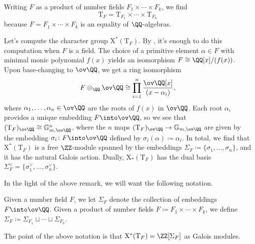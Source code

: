 \documentclass[../thesis.tex]{subfiles}
\begin{document}
\begin{remark} \label{rem:tf-of-algebra}
	Writing $F$ as a product of number fields $F_1\times\cdots\times F_k$, we find
	\[\mathrm T_F=\mathrm T_{F_1}\times\cdots\times\mathrm T_{F_k}\]
	because $F=F_1\times\cdots\times F_k$ is an equality of $\QQ$-algebras.
\end{remark}
\begin{remark}
	Let's compute the character group $\mathrm X^*(\mathrm T_F)$. By , it's enough to do this computation when $F$ is a field. The choice of a primitive element $\alpha\in F$ with minimal monic polynomial $f(x)$ yields an isomorphism $F\cong\QQ[x]/(f(x))$. Upon base-changing to $\ov\QQ$, we get a ring isomorphism
	\[F\otimes_\QQ\ov\QQ\cong\prod_{i=1}^n\frac{\ov\QQ[x]}{(x-\alpha_i)},\]
	where $\alpha_1,\ldots,\alpha_n\in\ov\QQ$ are the roots of $f(x)$ in $\ov\QQ$. Each root $\alpha_i$ provides a unique embedding $F\into\ov\QQ$, so we see that $(\mathrm T_F)_{\ov\QQ}\cong\mathbb G_{m,\ov\QQ}^n$, where the $n$ maps $(\mathrm T_F)_{\ov\QQ}\to\mathbb G_{m,\ov\QQ}$ are given by the embedding $\sigma_i\colon F\into\ov\QQ$ defined by $\sigma_i(\alpha)\coloneqq\alpha_i$. In total, we find that $\mathrm X^*(\mathrm T_F)$ is a free $\ZZ$-module spanned by the embeddings $\Sigma_F\coloneqq\{\sigma_1,\ldots,\sigma_n\}$, and it has the natural Galois action. Dually, $\mathrm X_*(\mathrm T_F)$ has the dual basis $\Sigma_F^\lor=\{\sigma_1^\lor,\ldots,\sigma_n^\lor\}$.
\end{remark}
In the light of the above remark, we will want the following notation.
\begin{notation}
	Given a number field $F$, we let $\Sigma_F$ denote the collection of embeddings $F\into\ov\QQ$. Given a product of number fields $F\coloneqq F_1\times\cdots\times F_k$, we define $\Sigma_F\coloneqq\Sigma_{F_1}\sqcup\cdots\sqcup\Sigma_{F_k}$.
\end{notation}
The point of the above notation is that $\mathrm X^*(\mathrm T_F)=\ZZ[\Sigma_F]$ as Galois modules.
\end{document}
